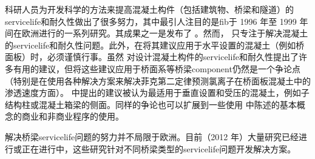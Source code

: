 科研人员为开发科学的方法来提高混凝土构件（包括建筑物、桥梁和隧道）的\gls*{servicelife}和耐久性做出了很多努力，其中最引人注目的是\acrfull{fib}于 1996 年至 1999 年间在欧洲进行的一系列研究。其成果之一是发布了 \cite{fib2006}。然而， 只专注于解决混凝土的\gls*{servicelife}和耐久性问题。此外，在将其建议应用于水平设置的混凝土（例如桥面板）时，必须谨慎行事。虽然  对设计混凝土构件的\gls*{servicelife}和耐久性提出了许多有用的建议，但将这些建议应用于桥面系等桥梁\gls*{component}仍然是一个争论点（特别是在使用各种解决方案来解决菲克第二定律预测氯离子在桥面板混凝土中的渗透速度方面）。 中提出的建议被认为最适用于垂直设置和受压的混凝土，例如子结构柱或混凝土箱梁的侧面。同样的争论也可以扩展到一些使用  中陈述的基本概念的商业和非商业程序的使用。

解决桥梁\gls*{servicelife}问题的努力并不局限于欧洲。目前（2012 年）大量研究已经进行或正在进行中，这些研究针对不同桥梁类型的\gls*{servicelife}问题开发解决方案。


